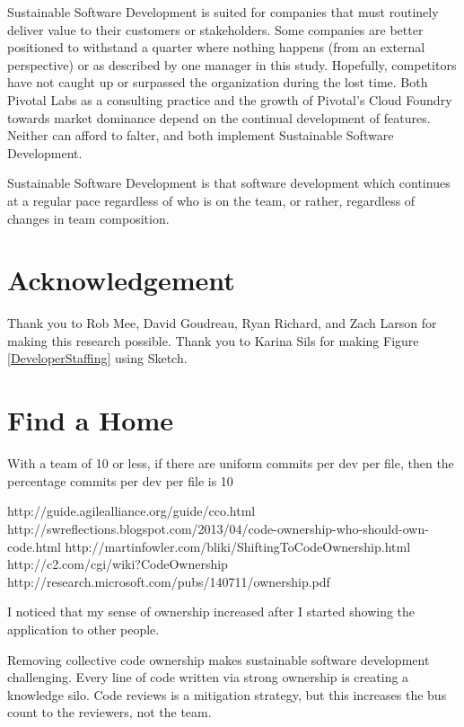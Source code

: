 \begin{table}[]
Sustainable Software Development is suited for companies that must routinely deliver value to their customers or stakeholders. Some companies are better positioned to withstand a quarter where nothing happens (from an external perspective) or   as described by one manager in this study. Hopefully, competitors have not caught up or surpassed the organization during the lost time. Both Pivotal Labs as a consulting practice and the growth of Pivotal's Cloud Foundry towards market dominance depend on the continual development of features. Neither can afford to falter, and both implement Sustainable Software Development.

Sustainable Software Development is that software development which continues at a regular pace regardless of who is on the team, or rather, regardless of changes in team composition.

\section{Acknowledgement}

Thank you to Rob Mee, David Goudreau, Ryan Richard, and Zach Larson for making this research possible. Thank you to Karina Sils for making Figure \ref{DeveloperStaffing} using Sketch.



\section{Find a Home}

With a team of 10 or less, if there are uniform commits per dev per file, then the percentage commits per dev per file is 10%

http://guide.agilealliance.org/guide/cco.html  
http://swreflections.blogspot.com/2013/04/code-ownership-who-should-own-code.html
http://martinfowler.com/bliki/ShiftingToCodeOwnership.html
http://c2.com/cgi/wiki?CodeOwnership
http://research.microsoft.com/pubs/140711/ownership.pdf

I noticed that my sense of ownership increased after I started showing the application to other people.

Removing collective code ownership makes sustainable software development challenging. Every line of code written via strong ownership is creating a knowledge silo. Code reviews is a mitigation strategy, but this increases the bus count to the reviewers, not the team. 




\end{table}
